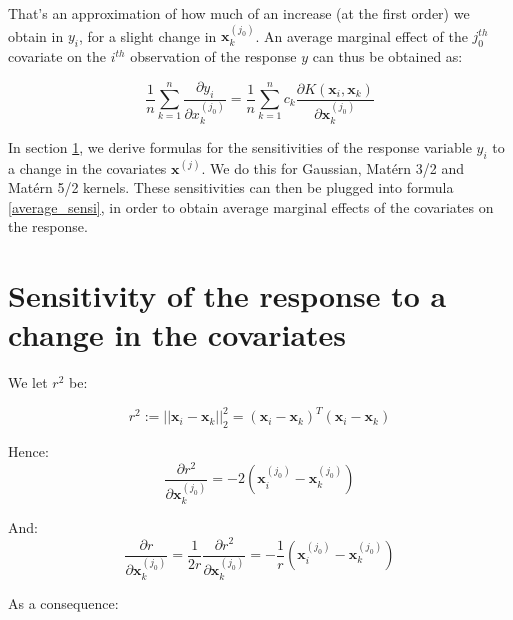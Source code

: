 \medskip

That's an approximation of how much of an increase (at the first order) we obtain in $y_i$,  for a slight change in $\textbf{x}_k^{(j_0)}$. An average marginal effect of the $j_0^{th}$ covariate on the $i^{th}$ observation of the response $y$ can thus be obtained as:

\begin{equation}
\label{average_sensi}
\frac{1}{n}\sum_{k = 1}^n \frac{\partial y_i}{\partial x_k^{(j_0)}} = \frac{1}{n}\sum_{k = 1}^n c_k \frac{\partial K(\textbf{x}_i, \textbf{x}_k)}{\partial \textbf{x}_k^{(j_0)}}
\end{equation}

\medskip

In section \ref{sec:sensitivity}, we derive formulas for the sensitivities of the response variable $y_i$ to a change in the covariates $\textbf{x}^{(j)}$. We do this for Gaussian, Mat\'ern 3/2 and Mat\'ern 5/2 kernels. These sensitivities can then be plugged into formula \ref{average_sensi}, in order to obtain average marginal effects of the covariates on the response.

\section{Sensitivity of the response to a change in the covariates}
\label{sec:sensitivity}

We let $r^2$ be:

$$
r^2 := || \textbf{x}_i - \textbf{x}_k ||^2_2 = (\textbf{x}_i - \textbf{x}_k)^T(\textbf{x}_i - \textbf{x}_k)
$$

Hence:
$$
\frac{\partial r^2}{\partial \textbf{x}_k^{(j_0)}} = -2\left(\textbf{x}_i^{(j_0)} - \textbf{x}_k^{(j_0)} \right)
$$

And:
$$
\frac{\partial r}{\partial \textbf{x}_k^{(j_0)}} = \frac{1}{2r}\frac{\partial r^2}{\partial \textbf{x}_k^{(j_0)}} = -\frac{1}{r}\left(\textbf{x}_i^{(j_0)} - \textbf{x}_k^{(j_0)} \right)
$$

\medskip

As a consequence: 

